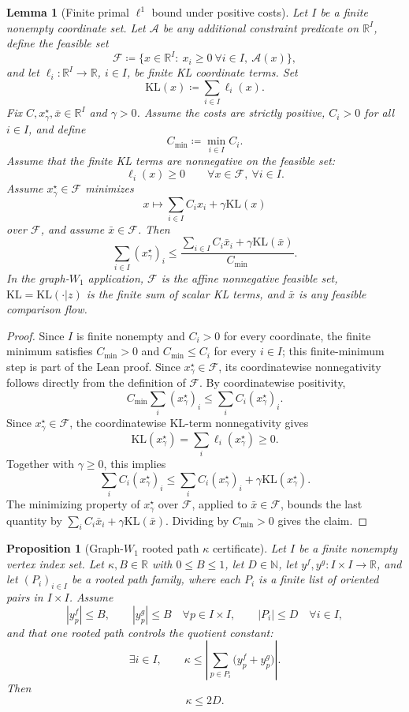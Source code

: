 \documentclass{article}
\theoremstyle{plain}
\newtheorem{lemma}{Lemma}[section]
\newtheorem{proposition}{Proposition}[section]
\newcommand{\RR}{\mathbb{R}}
\newcommand{\KL}{\mathrm{KL}}
\newcommand{\KLdiv}[2]{\mathrm{KL}(#1|#2)}
\begin{document}
\begin{lemma}[Finite primal $\ell^1$ bound under positive costs]\label{app-lem:l1-bound-from-feasible}
Let $I$ be a finite nonempty coordinate set.  Let $\mathcal A$ be any additional
constraint predicate on $\RR^I$, define the feasible set
\[
  \mathcal F\coloneqq
  \{x\in\RR^I:\ x_i\ge0\ \forall i\in I,\ \mathcal A(x)\},
\]
and let $\ell_i:\RR^I\to\RR$, $i\in I$, be finite KL coordinate terms.  Set
\[
  \KL(x)\coloneqq \sum_{i\in I}\ell_i(x).
\]
Fix $C,x_\gamma^\star,\bar x\in\RR^I$ and $\gamma>0$.  Assume the costs are
strictly positive, $C_i>0$ for all $i\in I$, and define
\[
  C_{\min}\coloneqq \min_{i\in I} C_i .
\]
Assume that the finite KL terms are nonnegative on the feasible set:
\[
  \ell_i(x)\ge0
  \qquad\forall x\in\mathcal F,\ \forall i\in I .
\]
Assume $x_\gamma^\star\in\mathcal F$
minimizes
\[
  x\longmapsto \sum_{i\in I} C_i x_i+\gamma\KL(x)
\]
over $\mathcal F$, and assume $\bar x\in\mathcal F$.  Then
\[
  \sum_{i\in I}(x_\gamma^\star)_i
  \le
  \frac{\sum_{i\in I} C_i\bar x_i+\gamma\KL(\bar x)}{C_{\min}}.
\]
In the graph-$W_1$ application, $\mathcal F$ is the affine nonnegative feasible set,
$\KL=\KLdiv{\cdot}{z}$ is the finite sum of scalar KL terms, and $\bar x$ is any
feasible comparison flow.
\end{lemma}

\begin{proof}
Since $I$ is finite nonempty and $C_i>0$ for every coordinate, the finite
minimum satisfies $C_{\min}>0$ and $C_{\min}\le C_i$ for every $i\in I$; this
finite-minimum step is part of the Lean proof.
Since $x_\gamma^\star\in\mathcal F$, its coordinatewise nonnegativity follows
directly from the definition of $\mathcal F$.  By coordinatewise positivity,
\[
  C_{\min}\sum_i(x_\gamma^\star)_i
  \le
  \sum_i C_i(x_\gamma^\star)_i .
\]
Since $x_\gamma^\star\in\mathcal F$, the coordinatewise KL-term nonnegativity gives
\[
  \KL(x_\gamma^\star)
  =\sum_i\ell_i(x_\gamma^\star)\ge0 .
\]
Together with $\gamma\ge0$, this implies
\[
  \sum_i C_i(x_\gamma^\star)_i
  \le
  \sum_i C_i(x_\gamma^\star)_i+\gamma\KL(x_\gamma^\star).
\]
The minimizing property of $x_\gamma^\star$ over $\mathcal F$, applied to
$\bar x\in\mathcal F$, bounds the last quantity by
$\sum_i C_i\bar x_i+\gamma\KL(\bar x)$.  Dividing by $C_{\min}>0$ gives the claim.
\end{proof}

\begin{proposition}[Graph-$W_1$ rooted path $\kappa$ certificate]\label{app-prop:kappa-graph-diameter}
Let $I$ be a finite nonempty vertex index set.
Let $\kappa,B\in\RR$ with $0\le B\le1$, let $D\in\mathbb{N}$, let
$y^{f},y^{g}:I\times I\to\RR$, and let $(P_i)_{i\in I}$ be a rooted
path family, where each $P_i$ is a finite list of oriented pairs in
$I\times I$.  Assume
\[
  |y^{f}_{p}|\le B,\qquad |y^{g}_{p}|\le B\quad\forall p\in I\times I,
  \qquad
  |P_i|\le D\quad\forall i\in I,
\]
and that one rooted path controls the quotient constant:
\[
  \exists i\in I,\qquad
  \kappa\le
  \left|\sum_{p\in P_i}\bigl(y^{f}_{p}+y^{g}_{p}\bigr)\right|.
\]
Then
\[
  \kappa\le 2D .
\]
\end{proposition}
\end{document}
